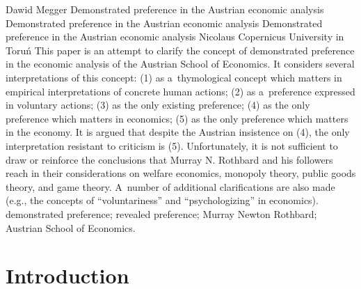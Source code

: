 \begin{artengenv}{Dawid Megger}
	{Demonstrated preference in the Austrian economic analysis}
	{Demonstrated preference in the Austrian economic analysis}
	{Demonstrated preference in the Austrian economic analysis}
	{Nicolaus Copernicus University in Toruń\label{megger-first}}
	{This paper is an attempt to clarify the concept of demonstrated preference in the economic analysis of the Austrian School of Economics. It considers several interpretations of this concept: (1) as a~thymological concept which matters in empirical interpretations of concrete human actions; (2) as a~preference expressed in voluntary actions; (3) as the only existing preference; (4) as the only preference which matters in economics; (5) as the only preference which matters in the economy. It is argued that despite the Austrian insistence on (4), the only interpretation resistant to criticism is (5). Unfortunately, it is not sufficient to draw or reinforce the conclusions that Murray N. Rothbard and his followers reach in their considerations on welfare economics, monopoly theory, public goods theory, and game theory. A~number of additional clarifications are also made (e.g., the concepts of ``voluntariness'' and ``psychologizing'' in economics).
	}
	{demonstrated preference; revealed preference; Murray Newton Rothbard; Austrian School of Economics.}








\section{Introduction}


\end{artengenv}
